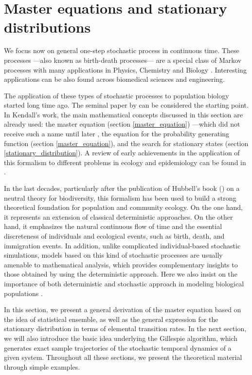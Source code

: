\section{Master equations and stationary distributions}
\label{MEq_Approach}
We focus now on general one-step stochastic process in continuous time. These processes ---also known as birth-death processes--- are a special class of Markov processes with many applications in Physics, Chemistry and Biology \citep{vanKampen92}. Interesting applications can be also found across biomedical sciences and engineering. 
\smallskip

The application of these types of stochastic processes to population biology started long time ago. The seminal paper by \citet{Kendall1948Logseries} can be considered the starting point. In Kendall's work, the main mathematical concepts discussed in this section are already used: the master equation (section \ref{master_equation}) ---which did not receive such a name until later \citep{vanKampen92}, the equation for the probability generating function (section \ref{master_equation}), and the search for stationary states (section \ref{stationary_distribution}). A review of early achievements in the application of this formalism to different problems in ecology and epidemiology can be found in \citet{Barlett60}.
\smallskip

In the last decades, particularly after the publication of Hubbell's book (\citeyear{Hubbell01}) on a neutral theory for biodiversity, this formalism has been used to build a strong theoretical foundation for population and community ecology. On the one hand, it represents an extension of classical deterministic approaches. On the other hand, it emphasizes the natural continuous flow of time and the essential discreteness of individuals and ecological events, such as birth, death, and immigration events. In addition, unlike complicated individual-based stochastic simulations, models based on this kind of stochastic processes are usually amenable to mathematical analysis, which provides complementary insights to those obtained by using the deterministic approach. Here we also insist on the importance of both deterministic and stochastic approach in modeling biological populations \citep{Nisbet82,Renshaw91}. 
\smallskip

In this section, we present a general derivation of the master equation based on the idea of statistical ensemble, as well as the general expression for the stationary distribution in terms of elemental transition rates. In the next section, we will also introduce the basic idea underlying the Gillespie algorithm, which generates exact sample trajectories of the stochastic temporal dynamics of a given system. Throughout all these sections, we present the theoretical material through simple examples.

